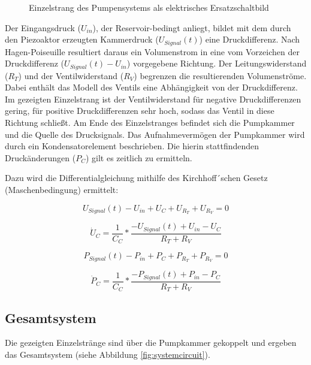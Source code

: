 \documentclass[fontsize=12pt, a4paper]{scrartcl}
\begin{document}
\begin{figure}[H]
	
	\caption{Einzelstrang des Pumpensystems als elektrisches Ersatzschaltbild}
	\label{singlebranch}
\end{figure}

Der Eingangsdruck ($U_{in}$), der Reservoir-bedingt anliegt, bildet mit dem durch den Piezoaktor erzeugten Kammerdruck ($U_{Signal}(t)$) eine Druckdifferenz. Nach Hagen-Poiseuille resultiert daraus ein Volumenstrom in eine vom Vorzeichen der Druckdifferenz ($U_{Signal}(t)-U_{in}$) vorgegebene Richtung. Der Leitungswiderstand ($R_{T}$) und der Ventilwiderstand ($R_{V}$) begrenzen die resultierenden Volumenströme. Dabei enthält das Modell des Ventils eine Abhängigkeit von der Druckdifferenz. Im gezeigten Einzelstrang ist der Ventilwiderstand für negative Druckdifferenzen gering, für positive Druckdifferenzen sehr hoch, sodass das Ventil in diese Richtung schließt. Am Ende des Einzelstranges befindet sich die Pumpkammer und die Quelle des Drucksignals. Das Aufnahmevermögen der Pumpkammer wird durch ein Kondensatorelement beschrieben. Die hierin stattfindenden Druckänderungen ($P_{C}$) gilt es zeitlich zu ermitteln.

Dazu wird die Differentialgleichung mithilfe des Kirchhoff´schen Gesetz (Maschenbedingung) ermittelt:

\begin{equation}
	U_{Signal}(t) - U_{in} + U_{C} + U_{R_{T}} + U_{R_{V}} = 0
\end{equation}

\begin{equation}
	\dot{U}_{C} = \frac{1}{C_{C}} * \frac{-U_{Signal}(t)+U_{in}-U_{C}}{R_{T}+R_{V}}
\end{equation}

\begin{equation}
	P_{Signal}(t) - P_{in} + P_{C} + P_{R_{T}} + P_{R_{V}} = 0
\end{equation}

\begin{equation}
	\dot{P}_{C} = \frac{1}{C_{C}} * \frac{-P_{Signal}(t)+P_{in}-P_{C}}{R_{T}+R_{V}}
\end{equation}


\subsection{Gesamtsystem}

Die gezeigten Einzelstränge sind über die Pumpkammer gekoppelt und ergeben das Gesamtsystem (siehe Abbildung \ref{fig:systemcircuit}).
\end{document}
